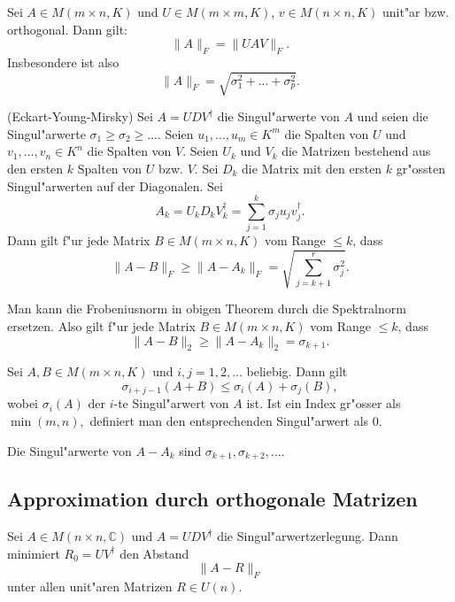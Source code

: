 \documentclass[11pt, a4paper]{article}
\begin{document}
\begin{lemma}
Sei $A \in M( m \times n, K)$ und $U \in M(m \times m, K)$, $v \in M(n \times n, K)$ unit"ar bzw. orthogonal. Dann gilt:
$$
\| A \|_F = \|UAV\|_F.
$$
Insbesondere ist also 
$$
\|A\|_F =  \sqrt{\sigma_1^2 + ... + \sigma_p^2}.
$$
\end{lemma}

\begin{theorem} (Eckart-Young-Mirsky) Sei $A = UDV^\dagger$ die Singul"arwerte von $A$ und seien die Singul"arwerte $\sigma_1 \geq  \sigma_2 \geq...$. Seien $u_1, ..., u_m \in K^m$ die Spalten von $U$ und $v_1, ..., v_n \in K^n$ die Spalten von $V$. Seien $U_k$ und $V_k$ die Matrizen bestehend aus den ersten $k$ Spalten von $U$ bzw. $V$. Sei $D_k$ die Matrix mit den ersten $k$ gr"ossten Singul"arwerten auf der Diagonalen. Sei 
$$
A_k = U_k D_k V_k^\dagger = \sum\limits_{j = 1}^k \sigma_j u_j v_j^\dagger.
$$
Dann gilt f"ur jede Matrix $B \in M( m \times n, K)$ vom Range $\leq k$, dass
$$
\|A - B\|_F \geq \|A - A_k \|_F = \sqrt{\sum\limits_{j = k+1}^r \sigma_j^2}.
$$
\end{theorem}

\begin{remark}
Man kann die Frobeniusnorm in obigen Theorem durch die Spektralnorm ersetzen. Also gilt f"ur jede Matrix $B \in M( m \times n, K)$ vom Range $\leq k$, dass
$$
\|A - B\|_2 \geq \|A - A_k \|_2 = \sigma_{k+1}.
$$
\end{remark}

\begin{corollary}
Sei $A, B \in M(m \times n, K)$ und $i, j = 1, 2, ...$ beliebig. Dann gilt
$$
\sigma_{i+j-1} (A+B) \leq \sigma_i(A) + \sigma_j(B), 
$$
wobei $ \sigma_i(A)$ der $i$-te Singul"arwert von $A$ ist. Ist ein Index gr"osser als $\min(m, n),$ definiert man den entsprechenden Singul"arwert als $0$.
\end{corollary}

\begin{remark}
Die Singul"arwerte von $A - A_k$ sind $\sigma_{k+1}, \sigma_{k+2}, ... .$
\end{remark}

\subsection{Approximation durch orthogonale Matrizen}
\begin{theorem}
Sei $A \in M(n \times n, \mathbb{C})$ und $A = UDV^\dagger$ die Singul"arwertzerlegung. Dann minimiert $R_0 = UV^\dagger$ den Abstand 
$$
\|A - R\|_F
$$
unter allen unit"aren Matrizen $R \in U(n)$.
\end{theorem}
\end{document}
